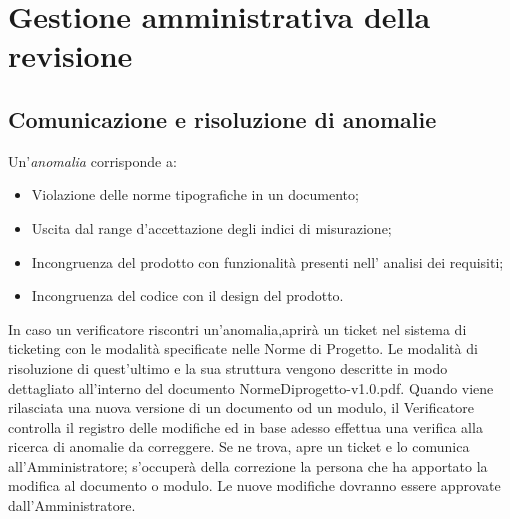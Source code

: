 \section{Gestione amministrativa della revisione}


\subsection{Comunicazione e risoluzione di anomalie}

Un'\textit{anomalia} corrisponde a:
\begin{itemize}

\item Violazione delle norme tipografiche in un documento;
\item Uscita dal range d'accettazione degli indici di misurazione;
\item Incongruenza del prodotto con funzionalità presenti nell' analisi dei requisiti;
\item Incongruenza del codice con il design del prodotto.

\end{itemize}

In caso un verificatore riscontri un'anomalia,aprirà un ticket nel sistema di ticketing con le modalità specificate nelle Norme di Progetto.
Le modalità di risoluzione di quest'ultimo e la sua struttura vengono descritte in modo dettagliato all'interno del documento NormeDiprogetto-v1.0.pdf.
Quando viene rilasciata una nuova versione di un documento od un modulo, il Verificatore controlla il registro delle modifiche ed in base adesso effettua una verifica alla ricerca di anomalie da correggere. Se ne trova, apre un ticket e lo comunica all'Amministratore; s'occuperà della correzione la persona che ha apportato la modifica al documento o modulo. Le nuove modifiche dovranno essere approvate dall'Amministratore.